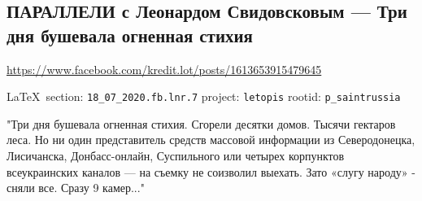  
 
  
\subsection{ПАРАЛЛЕЛИ с Леонардом Свидовсковым --- Три дня бушевала огненная стихия}
\label{sec:18_07_2020.fb.lnr.7}
\url{https://www.facebook.com/kredit.lot/posts/1613653915479645}

\vspace{0.5cm}
{\small\LaTeX~section: \verb|18_07_2020.fb.lnr.7| project: \verb|letopis| rootid: \verb|p_saintrussia|}
\vspace{0.5cm}

"Три дня бушевала огненная стихия. Сгорели десятки домов. Тысячи гектаров леса.
Но ни один представитель средств массовой информации из Северодонецка,
Лисичанска, Донбасс-онлайн, Суспильного или четырех корпунктов всеукраинских
каналов --- на съемку не соизволил выехать. Зато «слугу народу» - сняли все.
Сразу 9 камер..."
